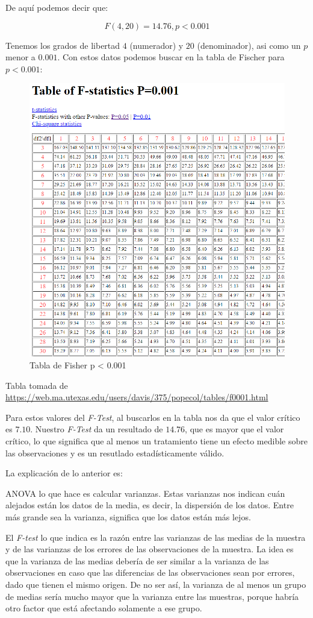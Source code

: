 \documentclass[]{article}
\begin{document}
De aquí podemos decir que:

\[F(4,20)=14.76, p < 0.001\]

Tenemos los grados de libertad \(4\) (numerador) y \(20\) (denominador),
asi como un \(p\) menor a \(0.001\). Con estos datos podemos buscar en
la tabla de Fischer para \(p<0.001\): \renewcommand{\figurename}{Fig.}

\begin{figure}

{\centering \includegraphics[width=0.3\linewidth]{ftable001} 

}

\caption{Tabla de Fisher p < 0.001}\label{fig:unnamed-chunk-9}
\end{figure}

Tabla tomada de
\url{https://web.ma.utexas.edu/users/davis/375/popecol/tables/f0001.html}

Para estos valores del \emph{F-Test}, al buscarlos en la tabla nos da
que el valor crítico es \(7.10\). Nuestro \emph{F-Test} da un resultado
de \(14.76\), que es mayor que el valor crítico, lo que significa que al
menos un tratamiento tiene un efecto medible sobre las observaciones y
es un resutlado estadísticamente válido.

La explicación de lo anterior es:

ANOVA lo que hace es calcular varianzas. Estas varianzas nos indican
cuán alejados están los datos de la media, es decir, la dispersión de
los datos. Entre más grande sea la varianza, significa que los datos
están más lejos.

El \emph{F-test} lo que indica es la razón entre las varianzas de las
medias de la muestra y de las varianzas de los errores de las
observaciones de la muestra. La idea es que la varianza de las medias
debería de ser similar a la varianza de las observaciones en caso que
las diferencias de las observaciones sean por errores, dado que tienen
el mismo origen. De no ser así, la varianza de al menos un grupo de
medias sería mucho mayor que la varianza entre las muestras, porque
habría otro factor que está afectando solamente a ese grupo.
\end{document}
